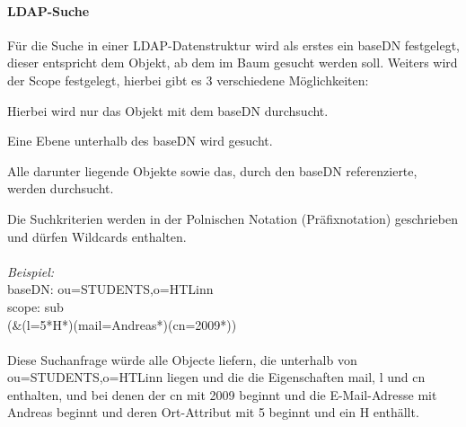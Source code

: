 \paragraph{LDAP-Suche}

Für die Suche in einer LDAP-Datenstruktur wird als erstes ein baseDN festgelegt, dieser entspricht dem Objekt, ab dem im Baum gesucht werden soll. Weiters wird der Scope festgelegt, hierbei gibt es 3 verschiedene Möglichkeiten:

\begin{description}[style=nextline]
	\item[base]
		Hierbei wird nur das Objekt mit dem baseDN durchsucht.
	\item[one]
		Eine Ebene unterhalb des baseDN wird gesucht.
	\item[sub]
		Alle darunter liegende Objekte sowie das, durch den baseDN referenzierte, werden durchsucht.
\end{description}
Die Suchkriterien werden in der Polnischen Notation (Präfixnotation) geschrieben und dürfen Wildcards enthalten.\\
\\
\textit{Beispiel:}\\
baseDN: ou=STUDENTS,o=HTLinn\\
scope: sub\\
(\&(l=5*H*)(mail=Andreas*)(cn=2009*))\\
\\
Diese Suchanfrage würde alle Objecte liefern, die unterhalb von ou=STUDENTS,o=HTLinn liegen und die die Eigenschaften mail, l und cn enthalten, und bei denen der cn mit 2009 beginnt und die E-Mail-Adresse mit Andreas beginnt und deren Ort-Attribut mit 5 beginnt und ein H enthällt.